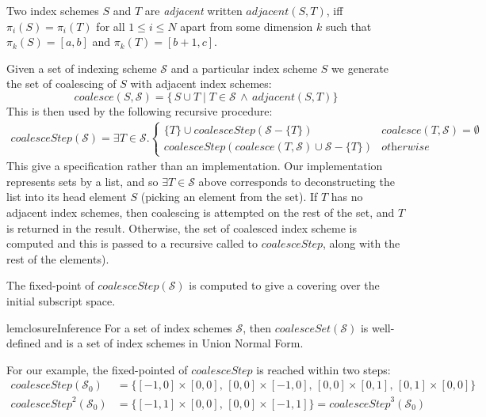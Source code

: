 \newcommand{\contig}[2]{\mathit{adjacent}(#1, #2)}
\begin{defn}[Adjacent]
  \label{def:contiguity}
  Two index schemes $S$ and $T$ are \emph{adjacent} written
  $\contig{S}{T}$, iff $\pi_i(S) = \pi_i(T)$ for all $1 \leq i \leq N$
  apart from some dimension $k$ such that $\pi_k(S) = [a, b]$ and
  $\pi_k(T) = [b+1, c]$.
\end{defn}
%
Given a set of indexing scheme $\mathcal{S}$ and a particular index scheme $S$
we generate the set of coalescing of $S$ with adjacent index schemes:
%
\begin{equation*}
\mathit{coalesce}(S, \mathcal{S}) = 
  \{\,S \cup T \mid T \in \mathcal{S} \, \wedge \,
  \contig{S}{T} \}
\end{equation*}
%
This is then used by the following recursive procedure:
%
\begin{align*}
  \mathit{coalesceStep}(\mathcal{S}) =
  \exists T \in \mathcal{S} . 
  \begin{cases}
    \{T\} \cup \mathit{coalesceStep}(\mathcal{S} - \{T\}) &
    \mathit{coalesce}(T, \mathcal{S}) = \emptyset \\
    \mathit{coalesceStep}(\mathit{coalesce}(T, \mathcal{S}) \cup
                                        \mathcal{S} - \{T\}) & \textit{otherwise}
  \end{cases}
\end{align*}
%
This give a specification rather than an implementation. Our
implementation represents sets by a list, and so
$\exists T \in \mathcal{S}$ above corresponds to deconstructing
the list into its head element $S$ (picking an element from the set).
If $T$ has no adjacent index schemes, then coalescing is attempted on
the rest of the set, and $T$ is returned in the result. Otherwise,
the set of coalesced index scheme is computed and this is passed to
a recursive called to $\mathit{coalesceStep}$, along with the rest of
the elements).

The fixed-point of $\textit{coalesceStep}(\mathcal{S})$ is computed to
give a covering over the initial subscript space.
%
\begin{restatable}{lem}{closureInference}
  \label{lem:closuer-inference}
  For a set of index schemes $\mathcal{S}$, then
  $\mathit{coalesceSet}(\mathcal{S})$ is well-defined and is a set of
  index schemes in Union Normal Form.
\end{restatable}
%
For our example, the fixed-pointed of $\mathit{coalesceStep}$ is reached within two
steps:
%
\begin{align*}
  \mathit{coalesceStep}(\mathcal{S}_0) & =
  \{[-1,0] \times [0,0],\,[0,0] \times [-1, 0],\,[0,0] \times
    [0,1],\,[0,1] \times [0,0]\} \\
  \mathit{coalesceStep}^2(\mathcal{S}_0) & =
  \{[-1, 1] \times [0, 0],\,[0, 0] \times [-1, 1]\} = \mathit{coalesceStep}^3(\mathcal{S}_0)
\end{align*}
%

